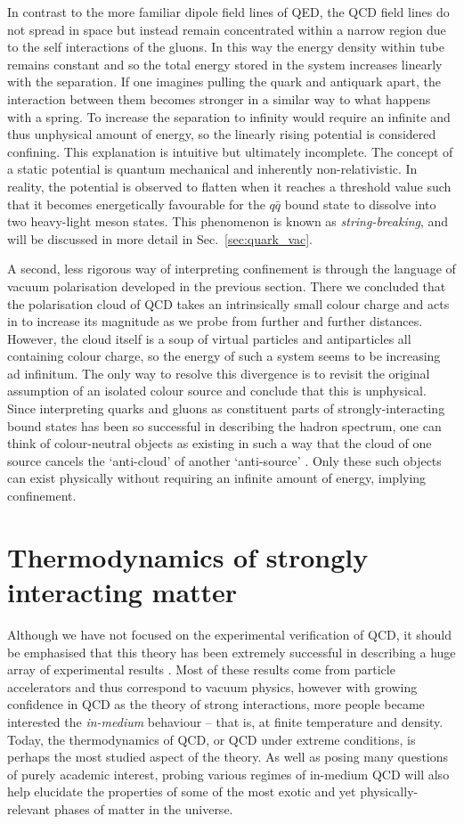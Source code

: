 \documentclass[11pt, a4paper, twoside]{book}
\begin{document}
In contrast to the more familiar dipole field lines of QED, the QCD field lines do not spread in space but instead remain concentrated within a narrow region due to the self interactions of the gluons. In this way the energy density within tube remains constant and so the total energy stored in the system increases linearly with the separation. If one imagines pulling the quark and antiquark apart, the interaction between them becomes stronger in a similar way to what happens with a spring. To increase the separation to infinity would require an infinite and thus unphysical amount of energy, so the linearly rising potential is considered confining. This explanation is intuitive but ultimately incomplete. The concept of a static potential is quantum mechanical and inherently non-relativistic. In reality, the potential is observed to flatten when it reaches a threshold value such that it becomes energetically favourable for the \(q\bar{q}\) bound state to dissolve into two heavy-light meson states. This phenomenon is known as \emph{string-breaking}, and will be discussed in more detail in Sec.~\ref{sec:quark_vac}.

A second, less rigorous way of interpreting confinement is through the language of vacuum polarisation developed in the previous section. There we concluded that the polarisation cloud of QCD takes an intrinsically small colour charge and acts in to increase its magnitude as we probe from further and further distances. However, the cloud itself is a soup of virtual particles and antiparticles all containing colour charge, so the energy of such a system seems to be increasing ad infinitum. The only way to resolve this divergence is to revisit the original assumption of an isolated colour source and conclude that this is unphysical. Since interpreting quarks and gluons as constituent parts of strongly-interacting bound states has been so successful in describing the hadron spectrum, one can think of colour-neutral objects as existing in such a way that the cloud of one source cancels the `anti-cloud' of another `anti-source' \cite{Wilczek_asymptoticfreedom}. Only these such objects can exist physically without requiring an infinite amount of energy, implying confinement.
\section{Thermodynamics of strongly interacting matter}
\label{sec:QCD_therm}
\onehalfspacing
Although we have not focused on the experimental verification of QCD, it should be emphasised that this theory has been extremely successful in describing a huge array of experimental results \cite{cahn_goldhaber_2009}. Most of these results come from particle accelerators and thus correspond to vacuum physics, however with growing confidence in QCD as the theory of strong interactions, more people became interested the \emph{in-medium} behaviour -- that is, at finite temperature and density. Today, the thermodynamics of QCD, or QCD under extreme conditions, is perhaps the most studied aspect of the theory. As well as posing many questions of purely academic interest, probing various regimes of in-medium QCD will also help elucidate the properties of some of the most exotic and yet physically-relevant phases of matter in the universe.
\end{document}
